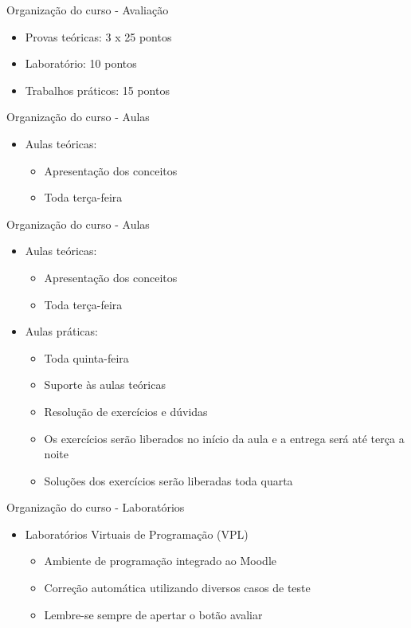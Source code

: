 \documentclass[t, aspectratio=169]{beamer}
\begin{document}
\begin{frame}[label={sec:org5e8ce5b}]{Organização do curso - Avaliação}
\begin{itemize}
\item Provas teóricas: 3 x 25 pontos
\item Laboratório: 10 pontos
\item Trabalhos práticos: 15 pontos
\end{itemize}
\end{frame}

\begin{frame}[label={sec:orgaaf569f}]{Organização do curso - Aulas}
\begin{itemize}
\item Aulas teóricas:
\begin{itemize}
\item Apresentação dos conceitos
\item Toda terça-feira
\end{itemize}
\end{itemize}
\end{frame}

\begin{frame}[label={sec:org6c6ab83}]{Organização do curso - Aulas}
\begin{itemize}
\item Aulas teóricas:
\begin{itemize}
\item Apresentação dos conceitos
\item Toda terça-feira
\end{itemize}

\item Aulas práticas:
\begin{itemize}
\item Toda quinta-feira
\item Suporte às aulas teóricas
\item Resolução de exercícios e dúvidas
\item Os exercícios serão liberados no início da aula e a entrega será até terça a noite
\item Soluções dos exercícios serão liberadas toda quarta
\end{itemize}
\end{itemize}
\end{frame}

\begin{frame}[label={sec:org0a163d7}]{Organização do curso - Laboratórios}
\begin{itemize}
\item Laboratórios Virtuais de Programação (VPL)
\begin{itemize}
\item Ambiente de programação integrado ao Moodle
\item Correção automática utilizando diversos casos de teste
\item Lembre-se sempre de apertar o botão \alert{avaliar}
\end{itemize}
\end{itemize}
\end{frame}
\end{document}
